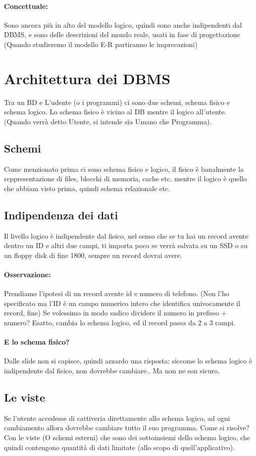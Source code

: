 \documentclass[12pt, a4paper, openany, twoside]{book}
\begin{document}
\paragraph{Concettuale:} Sono ancora più in alto del modello logico,
quindi sono anche indipendenti dal DBMS, e sono delle descrizioni del mondo
reale, usati in fase di progettazione (Quando studieremo il modello E-R 
partiranno le imprecazioni)
\section{Architettura dei DBMS}
Tra un BD e L'udente (o i programmi) ci sono due schemi, schema fisico e schema
logico. Lo schema fisico è vicino al DB mentre il logico all'utente. (Quando 
verrà detto Utente, si intende sia Umano che Programma).
\subsection{Schemi}
Come menzionato prima ci sono schema fisico e logico, il fisico è banalmente
la reppresentazione di files, blocchi di memoria, cache etc. mentre il logico
è quello che abbiam visto prima, quindi schema relazionale etc.
\subsection{Indipendenza dei dati}
Il livello logico è indipendente dal fisico, nel senso che se tu hai un record
avente dentro un ID e altri due campi, ti importa poco se verrà salvata su un
SSD o su un floppy disk di fine 1800, sempre un record dovrai avere.
\paragraph{Osservazione:} Prendiamo l'ipotesi di un record avente id e numero
di telefono. (Non l'ho specificato ma l'ID è un campo numerico intero 
che identifica univocamente il record, fine) Se volessimo in modo sadico dividere
il numero in prefisso + numero? Esatto, cambia lo schema logico, ed il record
passa da 2 a 3 campi.
\paragraph{E lo schema fisico?} Dalle slide non si capisce, quindi azzardo una
risposta: siccome lo schema logico è indipendente dal fisico, non dovrebbe
cambiare.. Ma non ne son sicuro.
\subsection{Le viste}
Se l'utente accedesse di cattiveria direttamente allo schema logico, ad ogni
cambiamento allora dovrebbe cambiare tutto il suo programma. Come si risolve?
Con le viste (O schemi esterni) che sono dei sottoinsiemi dello schema logico,
che quindi contengono quantità di dati limitate (allo scopo di quell'applicativo).
\end{document}
